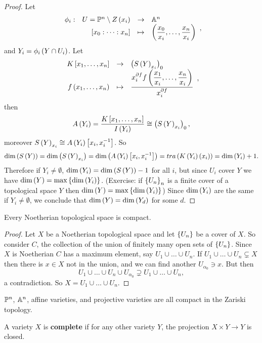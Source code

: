 \begin{proof}
Let
$$ \function[\phi_i]{U = \P^n \setminus Z\rb{x_i}}{\A^n}{\sb{x_0 : \dots : x_n}}{\rb{\dfrac{x_0}{x_i}, \dots, \dfrac{x_n}{x_i}}}, $$
and $ Y_i = \phi_i\rb{Y \cap U_i} $. Let
$$ \function{K\sb{x_1, \dots, x_n}}{\rb{S\rb{Y}_{x_i}}_0}{f\rb{x_1, \dots, x_n}}{\dfrac{x_i^{\partial f}f\rb{\dfrac{x_1}{x_i}, \dots, \dfrac{x_n}{x_i}}}{x_i^{\partial f}}}, $$
then
$$ A\rb{Y_i} = \dfrac{K\sb{x_1, \dots, x_n}}{I\rb{Y_i}} \cong \rb{S\rb{Y}_{x_i}}_0, $$
moreover $ S\rb{Y}_{x_i} \cong A\rb{Y_i}\sb{x_i, x_i^{-1}} $. So
$$ \dim\rb{S\rb{Y}} = \dim\rb{S\rb{Y}_{x_i}} = \dim\rb{A\rb{Y_i}\sb{x_i, x_i^{-1}}} = tra\rb{K\rb{Y_i}\rb{x_i}} = \dim\rb{Y_i} + 1. $$
Therefore if $ Y_i \ne \emptyset $, $ \dim\rb{Y_i} = \dim\rb{S\rb{Y}} - 1 $ for all $ i $, but since $ U_i $ cover $ Y $ we have $ \dim\rb{Y} = \max\cb{\dim\rb{Y_i}} $. (Exercise: if $ \cb{U_n}_n $ is a finite cover of a topological space $ Y $ then $ \dim\rb{Y} = \max\cb{\dim\rb{Y_i}} $) Since $ \dim\rb{Y_i} $ are the same if $ Y_i \ne \emptyset $, we conclude that $ \dim\rb{Y} = \dim\rb{Y_d} $ for some $ d $.
\end{proof}


\begin{proposition}
Every Noetherian topological space is compact.
\end{proposition}

\begin{proof}
Let $ X $ be a Noetherian topological space and let $ \cb{U_n} $ be a cover of $ X $. So consider $ C $, the collection of the union of finitely many open sets of $ \cb{U_n} $. Since $ X $ is Noetherian $ C $ has a maximum element, say $ U_1 \cup \dots \cup U_n $. If $ U_1 \cup \dots \cup U_n \subsetneq X $ then there is $ x \in X $ not in the union, and we can find another $ U_{\alpha_0} \ni x $. But then
$$ U_1 \cup \dots \cup U_n \cup U_{\alpha_0} \supsetneq U_1 \cup \dots \cup U_n, $$
a contradiction. So $ X = U_1 \cup \dots \cup U_n $.
\end{proof}

\begin{corollary}
$ \P^n $, $ \A^n $, affine varieties, and projective varieties are all compact in the Zariski topology.
\end{corollary}

\begin{definition}
A variety $ X $ is \textbf{complete} if for any other variety $ Y $, the projection $ X \times Y \to Y $ is closed.
\end{definition}

